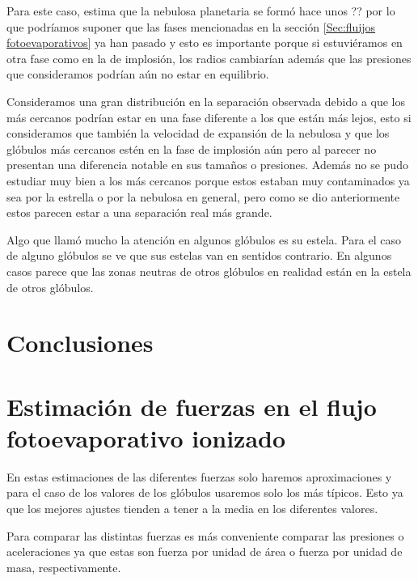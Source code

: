 \documentclass{book}
\begin{document}
Para este caso, \cite{} estima que la nebulosa planetaria se formó hace unos ?? por lo que podríamos suponer que las fases mencionadas en la sección \ref{Sec:fluijos fotoevaporativos} ya han pasado y esto es importante porque si estuviéramos en otra fase como en la de implosión, los radios cambiarían además que las presiones que consideramos podrían aún no estar en equilibrio. 

Consideramos una gran distribución en la separación observada debido a que los más cercanos podrían estar en una fase diferente a los que están más lejos, esto si consideramos que también la velocidad de expansión de la nebulosa y que los glóbulos más cercanos estén en la fase de implosión aún pero al parecer no presentan una diferencia notable en sus tamaños o presiones. Además no se pudo estudiar muy bien a los más cercanos porque estos estaban muy contaminados ya sea por la estrella o por la nebulosa en general, pero como se dio anteriormente estos parecen estar a una separación real más grande.

Algo que llamó mucho la atención en algunos glóbulos es su estela. Para el caso de alguno glóbulos se ve que sus estelas van en sentidos contrario. En algunos casos parece que las zonas neutras de otros glóbulos en realidad están en la estela de otros glóbulos.

\chapter{Conclusiones}

\appendix
\chapter{Estimación de fuerzas en el flujo fotoevaporativo ionizado} \label{App:fuerzas}

En estas estimaciones de las diferentes fuerzas solo haremos aproximaciones y para el caso de los valores de los glóbulos usaremos solo los más típicos. Esto ya que los mejores ajustes  tienden a tener a la media en los diferentes valores.

Para comparar las distintas fuerzas es más conveniente comparar las presiones o aceleraciones ya que estas son fuerza por unidad de área o fuerza por unidad de masa, respectivamente. 
\end{document}
